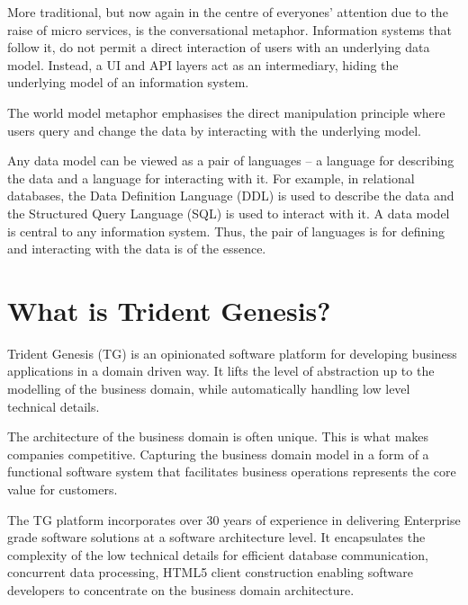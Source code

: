 \documentclass[a4paper,10pt,oneside,openright,final]{memoir} %
\begin{document}
	More traditional, but now again in the centre of everyones' attention due to the raise of micro services, is the conversational metaphor.
	Information systems that follow it, do not permit a direct interaction of users with an underlying data model.
	Instead, a UI and API layers act as an intermediary, hiding the underlying model of an information system.
	
	The world model metaphor emphasises the direct manipulation principle where users query and change the data by interacting with the underlying model.
	
	Any data model can be viewed as a pair of languages -- a language for describing the data and a language for interacting with it.
	For example, in relational databases, the Data Definition Language (DDL) is used to describe the data and the Structured Query Language (SQL) is used to interact with it.
	A data model is central to any information system.
	Thus, the pair of languages is for defining and interacting with the data is of the essence.



\section*{What is Trident Genesis?}
  Trident Genesis (TG) is an opinionated software platform for developing business applications in a domain driven way.
  It lifts the level of abstraction up to the modelling of the business domain, while automatically handling low level technical details.
  
  \vspace{3 mm}
  \noindent The architecture of the business domain is often unique. 
  This is what makes companies competitive.
  Capturing the business domain model in a form of a functional software system that facilitates business operations represents the core value for customers.
  
  \vspace{3 mm}
  \noindent The TG platform incorporates over 30 years of experience in delivering Enterprise grade software solutions at a software architecture level.
  It encapsulates the complexity of the low technical details for efficient database communication, concurrent data processing, HTML5 client construction enabling software developers to concentrate on the business domain architecture.
\end{document}
